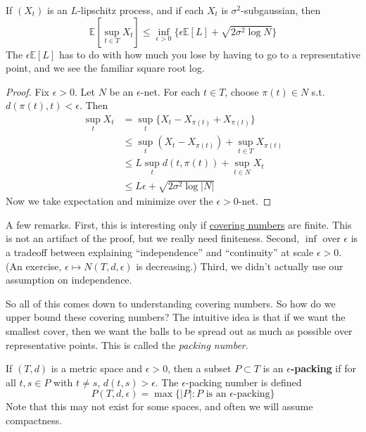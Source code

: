 \begin{theorem}
  \label{thm:chaining-bound-for-a-lipschitz-process}
  If $(X_t)$ is an $L$-lipschitz process, and if each $X_t$ is $\sigma^2$-subgaussian, then 
	\begin{equation}
		\mathbb{E}[ \sup_{t \in T} X_t] \leq \inf_{\epsilon > 0} \big\{ \epsilon \mathbb{E}[L] + \sqrt{2 \sigma^2 \log{N}} \big\}
	\end{equation}
	The $\epsilon \mathbb{E}[L]$ has to do with how much you lose by having to go to a representative point, and we see the familiar square root log. 
\end{theorem}
\begin{proof}
  Fix $\epsilon > 0$. Let $N$ be an $\epsilon$-net. For each $t \in T$, choose $\pi(t) \in N$ s.t. $d(\pi(t), t) < \epsilon$. Then 
	\begin{align}
		\sup_{t} X_t & = \sup_{t} \big\{ X_t - X_{\pi(t)} + X_{\pi(t)} \big\} \\ 
								 & \leq\sup_t (X_t - X_{\pi(t)}) + \sup_{t \in T} X_{\pi(t)} \\ 
								 & \leq L \sup_{t} d(t, \pi(t)) + \sup_{t \in N} X_t \\ 
								 & \leq L \epsilon + \sqrt{2 \sigma^2 \log{|N|}}
	\end{align}
	Now we take expectation and minimize over the $\epsilon > 0$-net. 
\end{proof}

A few remarks. First, this is interesting only if \hyperref[def:covering-number]{covering numbers} are finite. This is not an artifact of the proof, but we really need finiteness. Second, $\inf$ over $\epsilon$ is a tradeoff between explaining ``independence'' and ``continuity'' at scale $\epsilon > 0$. (An exercise, $\epsilon \mapsto N(T, d, \epsilon)$ is decreasing.) Third, we didn't actually use our assumption on independence. 

So all of this comes down to understanding covering numbers. So how do we upper bound these covering numbers? The intuitive idea is that if we want the smallest cover, then we want the balls to be spread out as much as possible over representative points. This is called the \textit{packing number}. 

\begin{definition}
  \label{def:packing-number}
  If $(T, d)$ is a metric space and $\epsilon > 0$, then a subset $P \subset T$ is an \textbf{$\epsilon$-packing} if for all $t, s \in P$ with $t \neq s$, $d(t, s) > \epsilon$. The $\epsilon$-packing number is defined 
	\begin{equation}
		P(T, d, \epsilon) = \max \{ |P| \colon P \text{ is an } \epsilon \text{-packing}\}
	\end{equation}
	Note that this may not exist for some spaces, and often we will assume compactness. 
\end{definition}

